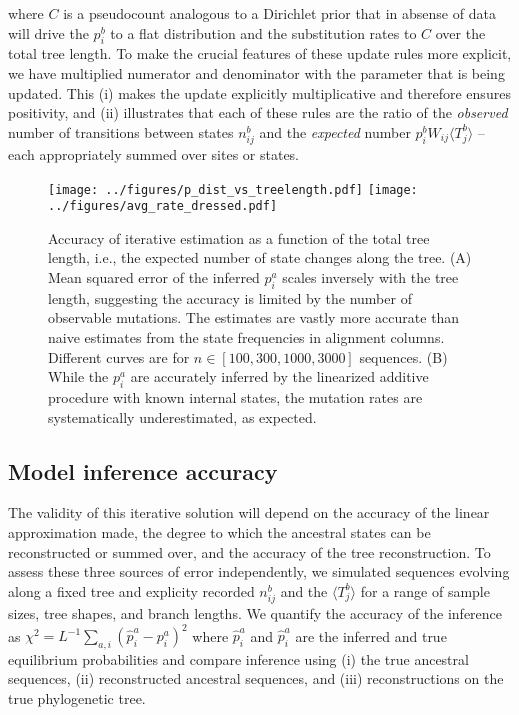 \documentclass[aps,rmp, onecolumn]{revtex4}
\newcommand{\eqp}{p}
\begin{document}
where $C$ is a pseudocount analogous to a Dirichlet prior that  in absense of data will drive the $\eqp_i^b$ to a flat distribution and the substitution rates to $C$ over the total tree length.
To make the crucial features of these update rules more explicit, we have multiplied numerator and denominator with the parameter that is being updated. This (i) makes the update explicitly multiplicative and therefore ensures positivity, and (ii) illustrates that each of these rules are the ratio of the {\it observed} number of transitions between states $n^b_{ij}$ and the {\it expected} number $\eqp^b_i W_{ij}\langle T_j^b\rangle$ -- each appropriately summed over sites or states.

\begin{figure}[tb]
	\centering
	\texttt{[image: ../figures/p\_dist\_vs\_treelength.pdf]}
	\texttt{[image: ../figures/avg\_rate\_dressed.pdf]}
	\caption{Accuracy of iterative estimation as a function of the total tree length, i.e., the expected number of state changes along the tree. (A) Mean squared error of the inferred $\eqp_i^a$ scales inversely with the tree length, suggesting the accuracy is limited by the number of observable mutations.
	The estimates are vastly more accurate than naive estimates from the state frequencies in alignment columns. Different curves are for $n\in [100,300,1000,3000]$ sequences.
	(B) While the $\eqp_i^a$ are accurately inferred by the linearized additive procedure with known internal states, the mutation rates are systematically underestimated, as expected. }
	\label{fig:dressed}
\end{figure}

\subsection*{Model inference accuracy}

The validity of this iterative solution will depend on the accuracy of the linear approximation made, the degree to which the ancestral states can be reconstructed or summed over, and the accuracy of the tree reconstruction.
To assess these three sources of error independently, we simulated sequences evolving along a fixed tree and explicity recorded $n_{ij}^b$ and the $\langle T_j^b\rangle$ for a range of sample sizes, tree shapes, and branch lengths.
We quantify the accuracy of the inference as $\chi^2 = L^{-1}\sum_{a,i}(\hat{\eqp}_i^a - \eqp_i^a)^2$ where $\hat{\eqp}_i^a$ and $\hat{\eqp}_i^a$ are the inferred and true equilibrium probabilities and compare inference using (i) the true ancestral sequences, (ii) reconstructed ancestral sequences, and (iii) reconstructions on the true phylogenetic tree.
\end{document}
